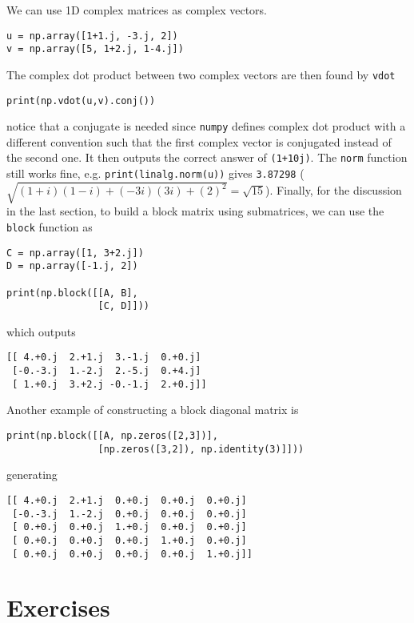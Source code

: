 We can use 1D complex matrices as complex vectors.
\begin{lstlisting}
u = np.array([1+1.j, -3.j, 2])
v = np.array([5, 1+2.j, 1-4.j])
\end{lstlisting}
The complex dot product between two complex vectors are then found by \verb|vdot|
\begin{lstlisting}
print(np.vdot(u,v).conj())
\end{lstlisting}
notice that a conjugate is needed since \verb|numpy| defines complex dot product with a different convention such that the first complex vector is conjugated instead of the second one. It then outputs the correct answer of \verb|(1+10j)|. The \verb|norm| function still works fine, e.g. \verb|print(linalg.norm(u))| gives \verb|3.87298| ($\sqrt{(1+i)(1-i) + (-3i)(3i) + (2)^2} = \sqrt{15}$). Finally, for the discussion in the last section, to build a block matrix using submatrices, we can use the \verb|block| function as
\begin{lstlisting}
C = np.array([1, 3+2.j])
D = np.array([-1.j, 2])

print(np.block([[A, B],
                [C, D]]))
\end{lstlisting}
which outputs
\begin{lstlisting}
[[ 4.+0.j  2.+1.j  3.-1.j  0.+0.j]
 [-0.-3.j  1.-2.j  2.-5.j  0.+4.j]
 [ 1.+0.j  3.+2.j -0.-1.j  2.+0.j]]    
\end{lstlisting}
Another example of constructing a block diagonal matrix is
\begin{lstlisting}
print(np.block([[A, np.zeros([2,3])],
                [np.zeros([3,2]), np.identity(3)]]))
\end{lstlisting}
generating
\begin{lstlisting}
[[ 4.+0.j  2.+1.j  0.+0.j  0.+0.j  0.+0.j]
 [-0.-3.j  1.-2.j  0.+0.j  0.+0.j  0.+0.j]
 [ 0.+0.j  0.+0.j  1.+0.j  0.+0.j  0.+0.j]
 [ 0.+0.j  0.+0.j  0.+0.j  1.+0.j  0.+0.j]
 [ 0.+0.j  0.+0.j  0.+0.j  0.+0.j  1.+0.j]]    
\end{lstlisting}

\section{Exercises}


